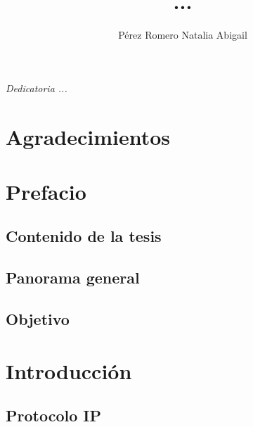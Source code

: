 \documentclass[letterpaper,12pt,oneside]{book}
\author{Pérez Romero Natalia Abigail}
\title{ ...}
\begin{document}
\frontmatter
\maketitle

\chapter*{}
\begin{flushright}%
  \emph{Dedicatoria ...}
  \thispagestyle{empty}
\end{flushright}

\chapter{Agradecimientos}

\tableofcontents

\chapter{Prefacio}

\section*{Contenido de la tesis}
\section*{Panorama general}
\section*{Objetivo}
    
\mainmatter

\chapter{Introducción} %

\section{Protocolo IP} %
\end{document}

